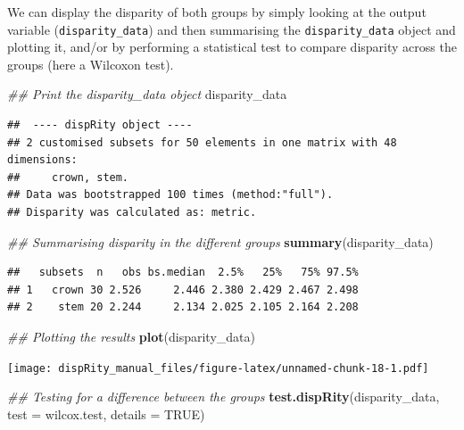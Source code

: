 \documentclass[]{book}
\newenvironment{Shaded}{\begin{snugshade}}{\end{snugshade}}
\newcommand{\CommentTok}[1]{\textcolor[rgb]{0.56,0.35,0.01}{\textit{#1}}}
\newcommand{\DataTypeTok}[1]{\textcolor[rgb]{0.13,0.29,0.53}{#1}}
\newcommand{\KeywordTok}[1]{\textcolor[rgb]{0.13,0.29,0.53}{\textbf{#1}}}
\newcommand{\NormalTok}[1]{#1}
\newcommand{\OtherTok}[1]{\textcolor[rgb]{0.56,0.35,0.01}{#1}}
\begin{document}
We can display the disparity of both groups by simply looking at the output variable (\texttt{disparity\_data}) and then summarising the \texttt{disparity\_data} object and plotting it, and/or by performing a statistical test to compare disparity across the groups (here a Wilcoxon test).

\begin{Shaded}
\begin{Highlighting}[]
\CommentTok{## Print the disparity_data object}
\NormalTok{disparity_data}
\end{Highlighting}
\end{Shaded}

\begin{verbatim}
##  ---- dispRity object ---- 
## 2 customised subsets for 50 elements in one matrix with 48 dimensions:
##     crown, stem.
## Data was bootstrapped 100 times (method:"full").
## Disparity was calculated as: metric.
\end{verbatim}

\begin{Shaded}
\begin{Highlighting}[]
\CommentTok{## Summarising disparity in the different groups}
\KeywordTok{summary}\NormalTok{(disparity_data)}
\end{Highlighting}
\end{Shaded}

\begin{verbatim}
##   subsets  n   obs bs.median  2.5%   25%   75% 97.5%
## 1   crown 30 2.526     2.446 2.380 2.429 2.467 2.498
## 2    stem 20 2.244     2.134 2.025 2.105 2.164 2.208
\end{verbatim}

\begin{Shaded}
\begin{Highlighting}[]
\CommentTok{## Plotting the results}
\KeywordTok{plot}\NormalTok{(disparity_data)}
\end{Highlighting}
\end{Shaded}

\texttt{[image: dispRity\_manual\_files/figure-latex/unnamed-chunk-18-1.pdf]}

\begin{Shaded}
\begin{Highlighting}[]
\CommentTok{## Testing for a difference between the groups}
\KeywordTok{test.dispRity}\NormalTok{(disparity_data, }\DataTypeTok{test =}\NormalTok{ wilcox.test, }\DataTypeTok{details =} \OtherTok{TRUE}\NormalTok{)}
\end{Highlighting}
\end{Shaded}
\end{document}
